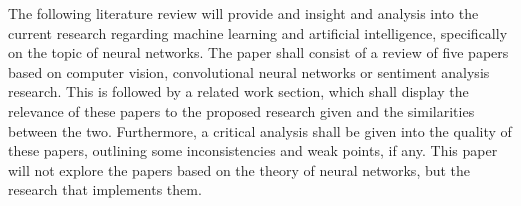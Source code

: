 
The following literature review will provide and insight and analysis into the current research regarding machine learning and artificial intelligence, specifically on the topic of neural networks. The paper shall consist of a review of five papers based on computer vision, convolutional neural networks or sentiment analysis research. This is followed by a related work section, which shall display the relevance of these papers to the proposed research given and the similarities between the two. Furthermore, a critical analysis shall be given into the quality of these papers, outlining some inconsistencies and weak points, if any. This paper will not explore the papers based on the theory of neural networks, but the research that implements them. 
\smallskip


